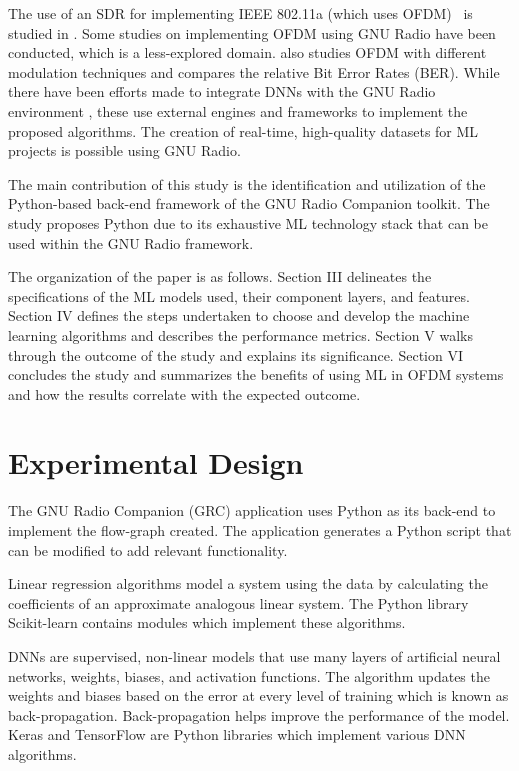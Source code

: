 \documentclass[conference]{IEEEtran}
\begin{document}
The use of an SDR for implementing IEEE 802.11a (which uses OFDM)  is studied in \cite{b6}. Some studies on implementing OFDM using GNU Radio \cite{b7} have been conducted, which is a less-explored domain. \cite{b8} also studies OFDM with different modulation techniques and compares the relative Bit Error Rates (BER). While there have been efforts made to integrate DNNs with the GNU Radio environment \cite{b9}, these use external engines and frameworks to implement the proposed algorithms. The creation of real-time, high-quality datasets for ML projects\cite{b10} is possible using GNU Radio.


The main contribution of this study is the identification and utilization of the Python-based back-end framework of the GNU Radio Companion toolkit. The study proposes Python due to its exhaustive ML technology stack that can be used within the GNU Radio framework.

The organization of the paper is as follows. Section III delineates the specifications of the ML models used, their component layers, and features. Section IV defines the steps undertaken to choose and develop the machine learning algorithms and describes the performance metrics. Section V walks through the outcome of the study and explains its significance. Section VI concludes the study and summarizes the benefits of using ML in OFDM systems and how the results correlate with the expected outcome.

\section{Experimental Design}
The GNU Radio Companion (GRC) application uses Python as its back-end to implement the flow-graph created. The application generates a Python script that can be modified to add relevant functionality.

Linear regression algorithms model a system using the data by calculating the coefficients of an approximate analogous linear system. The Python library Scikit-learn contains modules which implement these algorithms.

DNNs are supervised, non-linear models that use many layers of artificial neural networks, weights, biases, and activation functions. The algorithm updates the weights and biases based on the error at every level of training which is known as back-propagation. Back-propagation helps improve the performance of the model. Keras and TensorFlow are Python libraries which implement various DNN algorithms.
\end{document}
